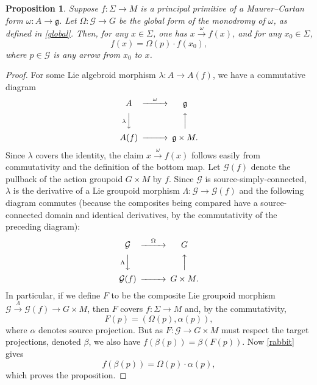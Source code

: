 \documentclass[11pt]{article}
\numberwithin{equation}{section}
\numberwithin{equation}{section}
\newtheorem{Proposition}[Theorem]{Proposition}
\begin{document}
\begin{Proposition}\label{uniquenessP}
 Suppose $f \colon \Sigma \rightarrow M$ is a principal primitive of
 a Maurer--Cartan form $\omega \colon A \rightarrow {\mathfrak g} $.
 Let $\Omega \colon {\mathcal G} \rightarrow G$ be the global form of
 the monodromy of $\omega $, as defined in \eqref{global}. Then, for
 any $x \in \Sigma $, one has $x\xrightarrow{\omega}f(x)$, and for
 any $x_0\in \Sigma $,
 \begin{equation*} f(x)=\Omega(p)\cdot f(x_0),
 \end{equation*} where $p \in {\mathcal G} $ is any arrow from $x_0$
to $x$.
\end{Proposition}
\begin{proof} For some Lie algebroid morphism $\lambda \colon A
\rightarrow A(f)$, we have a commutative diagram
 \begin{equation*}
 \begin{CD} A @>{\omega }>> {\mathfrak g} \\ @V{\lambda}VV @AAA \\
A(f) @>>> {\mathfrak g} \times M.
 \end{CD}
 \end{equation*}
 Since $\lambda$ covers the identity, the claim
$x\xrightarrow{\omega}f(x)$ follows easily from commutativity and the
definition of the bottom map. Let ${\mathcal G}(f)$ denote the
pullback of the action groupoid $G \times M$ by $f$. Since ${\mathcal
G} $ is source-simply-connected, $\lambda$ is the derivative of a Lie
groupoid morphism $\Lambda \colon {\mathcal G} \rightarrow {\mathcal
G}(f)$ and the following diagram commutes (because the composites
being compared have a source-connected domain and identical
derivatives, by the commutativity of the preceding diagram):
 \begin{equation*}
 \begin{CD} {\mathcal G} @>{\Omega }>> G \\ @V{\Lambda}VV @AAA \\
{\mathcal G}(f) @>>> G\times M.
 \end{CD}
 \end{equation*}
 In particular, if we define $F$ to be the composite
Lie groupoid morphism ${\mathcal G}\xrightarrow{\Lambda}{\mathcal
G}(f)\rightarrow G \times M$, then $F$ covers $f \colon \Sigma
\rightarrow M$ and, by the commutativity,
\begin{equation}
F(p)=(\Omega(p),\alpha(p)),\label{rabbit}
\end{equation} where $\alpha $ denotes source projection. But as $F
\colon {\mathcal G} \rightarrow G \times M$ must respect the target
projections, denoted $\beta$, we also have
$f(\beta(p))=\beta(F(p))$. Now \eqref{rabbit} gives
\begin{equation*} f(\beta(p))=\Omega(p) \cdot \alpha(p),
\end{equation*} which proves the proposition.
\end{proof}
\end{document}
